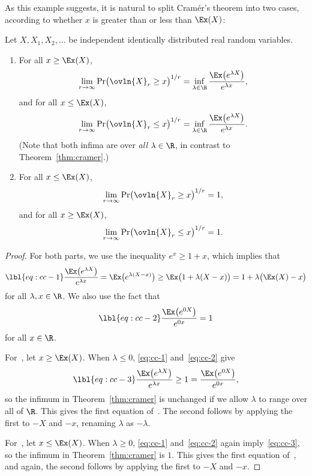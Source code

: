 As this example suggests, it is natural to split Cram\'er's theorem into
two cases, according to whether $x$ is greater than or less than $\Ex(X)$:

\begin{cor}
Let $X, X_1, X_2, \ldots$ be independent identically distributed real
random variables.  
% 
\begin{enumerate}
\item 
{}
For all $x \geq \Ex(X)$,
\[
\lim_{r \to \infty} \Pr\bigl(\ovln{X}_r \geq x\bigr)^{1/r}
=
\inf_{\lambda \in \R} 
\frac{\Ex\bigl(e^{\lambda X}\bigr)}{e^{\lambda x}},
\]
and for all $x \leq \Ex(X)$,
\[
\lim_{r \to \infty} \Pr\bigl(\ovln{X}_r \leq x\bigr)^{1/r}
=
\inf_{\lambda \in \R} 
\frac{\Ex\bigl(e^{\lambda X}\bigr)}{e^{\lambda x}}.
\]
(Note that both infima are over \emph{all} $\lambda \in \R$, in contrast to 
Theorem~\ref{thm:cramer}.)

\item
{}
For all $x \leq \Ex(X)$,
\[
\lim_{r \to \infty} \Pr\bigl(\ovln{X}_r \geq x\bigr)^{1/r} 
=
1,
\]
and for all $x \geq \Ex(X)$,
\[
\lim_{r \to \infty} \Pr\bigl(\ovln{X}_r \leq x\bigr)^{1/r} 
=
1.
\]
\end{enumerate}
\end{cor}

\begin{proof}
For both parts, we use the inequality $e^x \geq 1 + x$, which implies that
% 
\begin{equation}
\lbl{eq:cc-1}
\frac{\Ex\bigl(e^{\lambda X}\bigr)}{e^{\lambda x}}
=
\Ex\bigl(e^{\lambda(X - x)}\bigr)
\geq
\Ex\bigl(1 + \lambda(X - x)\bigr)
=
1 + \lambda\bigl(\Ex(X) - x\bigr)  
\end{equation}
% 
for all $\lambda, x \in \R$.  We also use the fact that
% 
\begin{equation}
\lbl{eq:cc-2}
\frac{\Ex\bigl(e^{0X}\bigr)}{e^{0x}} = 1
\end{equation}
% 
for all $x \in \R$.

For~, let $x \geq \Ex(X)$.  When $\lambda \leq
0$, \eqref{eq:cc-1} and~\eqref{eq:cc-2} give
% 
\begin{equation}
\lbl{eq:cc-3}
\frac{\Ex\bigl(e^{\lambda X}\bigr)}{e^{\lambda x}}
\geq
1 
=
\frac{\Ex\bigl(e^{0 X}\bigr)}{e^{0 x}},
\end{equation}
% 
so the infimum in Theorem~\ref{thm:cramer} is unchanged if we allow
$\lambda$ to range over all of $\R$.  This gives the first equation
of~.  The second follows by applying the first to
$-X$ and $-x$, renaming $\lambda$ as $-\lambda$.

For~, let $x \leq \Ex(X)$.  When $\lambda \geq
0$, \eqref{eq:cc-1} and~\eqref{eq:cc-2} again imply~\eqref{eq:cc-3}, so the
infimum in Theorem~\ref{thm:cramer} is $1$.  This gives the first equation
of~, and again, the second follows by applying the
first to $-X$ and $-x$.
\end{proof}


